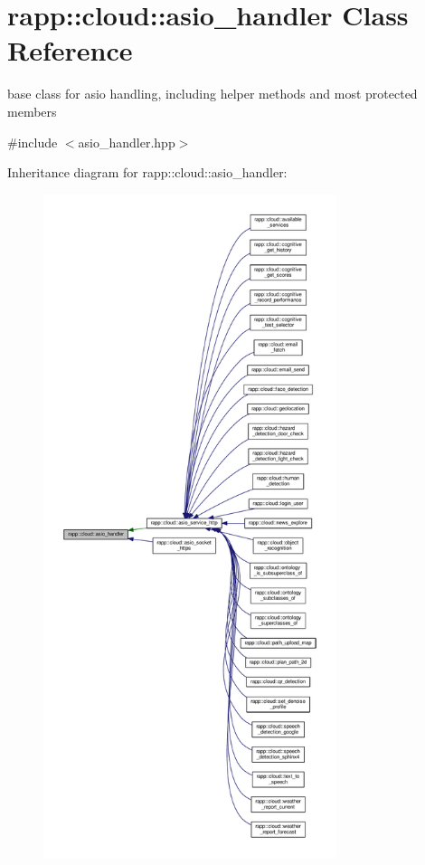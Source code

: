\hypertarget{classrapp_1_1cloud_1_1asio__handler}{\section{rapp\-:\-:cloud\-:\-:asio\-\_\-handler Class Reference}
\label{classrapp_1_1cloud_1_1asio__handler}
}


base class for asio handling, including helper methods and most protected members  




{\ttfamily \#include $<$asio\-\_\-handler.\-hpp$>$}



Inheritance diagram for rapp\-:\-:cloud\-:\-:asio\-\_\-handler\-:
\nopagebreak
\begin{figure}[H]
\begin{center}
\leavevmode
\includegraphics[height=550pt]{classrapp_1_1cloud_1_1asio__handler__inherit__graph}
\end{center}
\end{figure}

